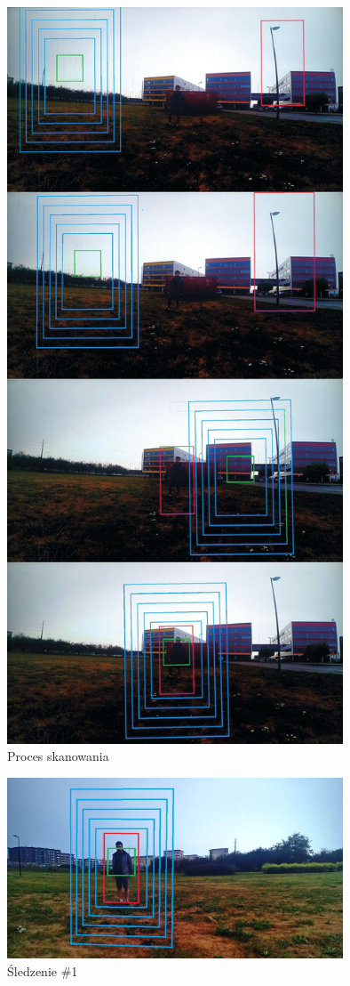 \begin{figure}[h]
	\centering
	\includegraphics[width=10cm]{6_scan_1.jpg}
	\caption{Proces skanowania} 
	\label{fig:scan_screenshot}
\end{figure}

\begin{figure}[h]
	\centering
	\includegraphics[width=10cm]{6_track_1.jpg}
	\caption{Śledzenie \#1}
	\label{fig:track_1}
\end{figure}

